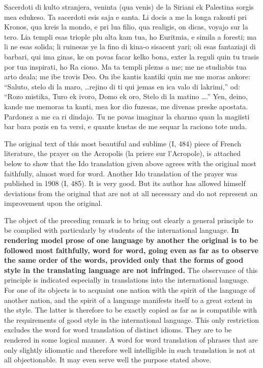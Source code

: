 \begin{parcolumns}[nofirstindent=true]{2}
{        Sacerdoti di kulto stranjera, veninta (qua venis) de la Siriani ek Pales\-tina sorgis mea edukeso. Ta sacerdoti esis saja e santa. Li docis a me la longa rakonti pri Kronos, qua kreis la mondo, e pri lua filio, qua realigis, on dicas, voyajo sur la tero. Lia templi esas triople plu alta kam tua, ho Euritmia, e simila a foresti; ma li ne esas solida; li ruinesas ye la fino di kina-o sisacent yari; oli esas fantaziaji di barbari, qui ima ginas, ke on povas facar kelko bona, exter la reguli quin tu trasis por tua inspirati, ho Ra ciono. Ma ta templi plezas a me; me ne studiabis tua arto deala; me ibe trovis Deo. On ibe kantis kantiki quin me me moras ankore: ``Saluto, stelo di la maro, \ldots re\-jino di ti qui jemas en ica valo di lakrimi,” od: ``Rozo mistika, Turo ek ivoro, Domo ek oro, Stelo di la matino \ldots .'' Yen, deino, kande me memoras ta kanti, mea kor dio fuzesas, me divenas preske apostata. Pardonez a me ca ri dindajo. Tu ne povas imaginar la charmo quan la magiisti bar bara pozis en ta versi, e quante kustas de me sequar la raciono tote nuda. 
    }
    \colplacechunks
\end{parcolumns}

The original text of this most beautiful and sublime (I, 484) piece of French literature, the prayer on the Acropolis (la priere sur l'Acropole), is attached below to show that the Ido translation given above agrees with the original most faithfully, almost word for word. Another Ido translation of the prayer was published in 1908 (I, 485). It is very good. But its author has allowed himself deviations from the original that are not at all necessary and do not represent an improvement upon the original. 

The object of the preceding remark is to bring out clearly a general principle to be complied with particularly by students of the international language. \textbf{In rendering model prose of one language by another the original is to be followed most faithfully, word for word, going even as far as to observe the same order of the words, provided only that the forms of good style in the translating language are not infringed.} The observance of this principle is indicated especially in translations into the international language. For one of its objects is to acquaint one nation with the spirit of the language of another nation, and the spirit of a language manifests itself to a great extent in the style. The latter is therefore to be exactly copied as far as is compatible with the requirements of good style in the international language. This only restriction excludes the word for word translation of distinct idioms. They are to be rendered in some logical manner. A word for word translation of phrases that are only slightly idiomatic and therefore well intelligible in such translation is not at all objectionable. It may even serve well the purpose stated above.

